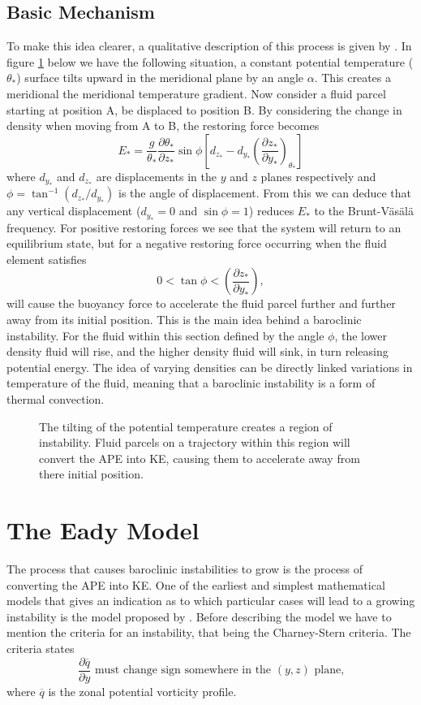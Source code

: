 \documentclass[a4paper,12pt]{article}
\begin{document}
\subsection{Basic Mechanism} 
To make this idea clearer, a qualitative description of this process is given by \cite{Pedlosky1979}. In figure \ref{pedloskyexample} below we have the following situation, a constant potential temperature ($\theta_*$) surface tilts upward in the meridional plane by an angle $\alpha$. This creates a meridional the meridional temperature gradient. Now consider a fluid parcel starting at position A, be displaced to position B. By considering the change in density when moving from A to B, the restoring force becomes  
\begin{equation}
  E_* = \frac{g}{\theta_*}\frac{\partial\theta_*}{\partial z_*}\sin\phi\left[d_{z_*}-d_{y_*}\left(\frac{\partial z_*}{\partial y_*}\right)_{\theta_*}\right]
\end{equation}
where $d_{y_*}$ and $d_{z_*}$ are displacements in the $y$ and $z$ planes respectively and $\phi=\tan^{-1}(d_{z_*}/d_{y_*})$ is the angle of displacement. From this we can deduce that any vertical displacement ($d_{y_*}=0$ and $\sin\phi = 1$) reduces $E_*$ to the Brunt-V\"as\"al\"a frequency. For positive restoring forces we see that the system will return to an equilibrium state, but for a negative restoring force occurring when the fluid element satisfies
\begin{equation}
  0 < \tan\phi < \left(\frac{\partial z_*}{\partial y_*}\right),
\end{equation}
will cause the buoyancy force to accelerate the fluid parcel further and further away from its initial position. This is the main idea behind a baroclinic instability. For the fluid within this section defined by the angle $\phi$, the lower density fluid will rise, and the higher density fluid will sink, in turn releasing potential energy. The idea of varying densities can be directly linked variations in temperature of the fluid, meaning that a baroclinic instability is a form of thermal convection.
\begin{figure}
  \centering
  
  \caption{The tilting of the potential temperature creates a region of instability. Fluid parcels on a trajectory within this region will convert the APE into KE, causing them to accelerate away from there initial position. }
  \label{pedloskyexample}
\end{figure}

\section{The Eady Model}
The process that causes baroclinic instabilities to grow is the process of converting the APE into KE. One of the earliest and simplest mathematical models that gives an indication as to which particular cases will lead to a growing instability is the model proposed by \cite{Eady1949}. Before describing the model we have to mention the criteria for an instability, that being the Charney-Stern criteria. The criteria states 
$$\frac{\partial\overline{q}}{\partial y}\text{ must change sign somewhere in the }(y,z)\text{ plane,} $$
where $\overline{q}$ is the zonal potential vorticity profile. 
\end{document}
